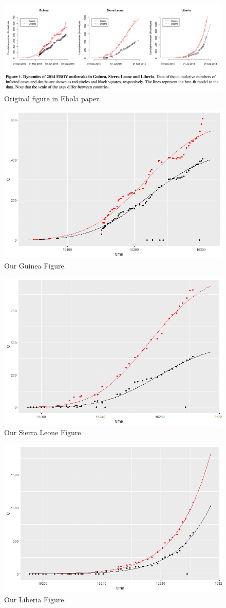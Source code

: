 \begin{figure}[h]
\centering
\includegraphics[width=1\linewidth]{./figures/original_figure_SEIR_paper}
\caption{Original figure in Ebola paper.}
\label{fig:original_figure_SEIR_paper}
\end{figure}

\begin{figure}[h]
\centering
\includegraphics[width=0.7\linewidth]{./figures/my_fit_Gui}
\caption{Our Guinea Figure.}
\label{fig:my_fit_Gui}
\end{figure}

\begin{figure}[h]
\centering
\includegraphics[width=0.7\linewidth]{./figures/my_fit_SL}
\caption{Our Sierra Leone Figure.}
\label{fig:my_fit_SL}
\end{figure}

\begin{figure}[h]
\centering
\includegraphics[width=0.7\linewidth]{./figures/my_fit_Lib}
\caption{Our Liberia Figure.}
\label{fig:my_fit_Lib}
\end{figure}

